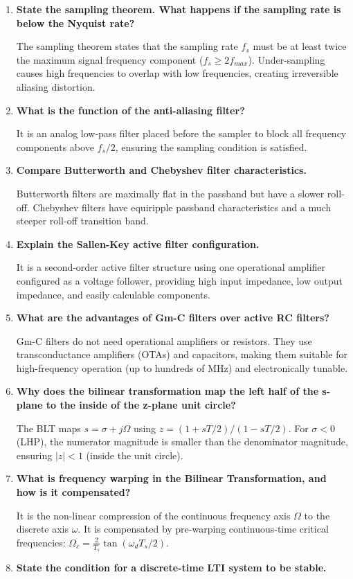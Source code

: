 \documentclass[12pt,a4paper]{article}
\newcommand{\Q}[1]{\textbf{#1}\par\noindent\ignorespaces}
\begin{document}
\begin{tcolorbox}[exambox, title={\textbf{Frequently Asked / Viva Questions}}]
\begin{enumerate}[topsep=0pt, label=\textbf{Q\arabic*.}, itemsep=5pt]
  \item \Q{State the sampling theorem. What happens if the sampling rate is below the Nyquist rate?}
    The sampling theorem states that the sampling rate $f_s$ must be at least twice the maximum signal frequency component ($f_s \ge 2 f_{max}$). Under-sampling causes high frequencies to overlap with low frequencies, creating irreversible aliasing distortion.
  \item \Q{What is the function of the anti-aliasing filter?}
    It is an analog low-pass filter placed before the sampler to block all frequency components above $f_s/2$, ensuring the sampling condition is satisfied.
  \item \Q{Compare Butterworth and Chebyshev filter characteristics.}
    Butterworth filters are maximally flat in the passband but have a slower roll-off. Chebyshev filters have equiripple passband characteristics and a much steeper roll-off transition band.
  \item \Q{Explain the Sallen-Key active filter configuration.}
    It is a second-order active filter structure using one operational amplifier configured as a voltage follower, providing high input impedance, low output impedance, and easily calculable components.
  \item \Q{What are the advantages of Gm-C filters over active RC filters?}
    Gm-C filters do not need operational amplifiers or resistors. They use transconductance amplifiers (OTAs) and capacitors, making them suitable for high-frequency operation (up to hundreds of MHz) and electronically tunable.
  \item \Q{Why does the bilinear transformation map the left half of the s-plane to the inside of the z-plane unit circle?}
    The BLT maps $s = \sigma + j\Omega$ using $z = (1+sT/2)/(1-sT/2)$. For $\sigma < 0$ (LHP), the numerator magnitude is smaller than the denominator magnitude, ensuring $|z| < 1$ (inside the unit circle).
  \item \Q{What is frequency warping in the Bilinear Transformation, and how is it compensated?}
    It is the non-linear compression of the continuous frequency axis $\Omega$ to the discrete axis $\omega$. It is compensated by pre-warping continuous-time critical frequencies: $\Omega_c = \frac{2}{T_s}\tan(\omega_d T_s /2)$.
  \item \Q{State the condition for a discrete-time LTI system to be stable.}

\end{enumerate}
\end{tcolorbox}
\end{document}
